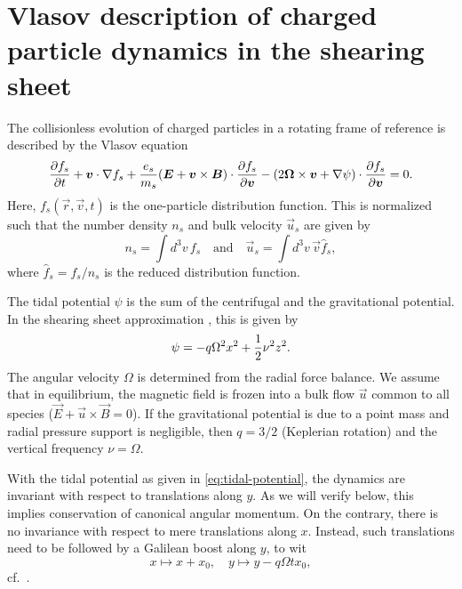 \documentclass[aps,pre,notitlepage,amsmath,amssymb,amsfonts,nobibnotes,nofootinbib,superscriptaddress]{revtex4-1}
\begin{document}
\section{Vlasov description of charged particle dynamics in the shearing
sheet}
\label{sec:vlasov-sheet}

The collisionless evolution of charged particles in a rotating frame of
reference is described by the Vlasov equation
\begin{equation}
  \label{eq:vlasov-sheet}
  \pder{f_s}{t} + \vec{v}\cdot\nabla f_s
  + \frac{\qs}{m_s}(\vec{E} + \vec{v}\times\vec{B})\cdot\pder{f_s}{\vec{v}}
  - (2\vec{\Omega}\times\vec{v} + \nabla\psi)\cdot\pder{f_s}{\vec{v}} = 0.
\end{equation}
Here, $f_s(\vec{r},\vec{v},t)$ is the one-particle distribution function. This
is normalized such that the number density $n_s$ and bulk velocity $\vec{u}_s$
are given by
\begin{equation}
  \label{eq:moments}
  n_s = \int d^3v\,f_s
  \quad\textrm{and}\quad
  \vec{u}_s = \int d^3v\,\vec{v}\hat{f}_s,
\end{equation}
where $\hat{f}_s=f_s/n_s$ is the reduced distribution function.

The tidal potential $\psi$ is the sum of the centrifugal and the gravitational
potential. In the shearing sheet approximation \citep{Goldreich1965}, this is
given by
\begin{equation}
  \label{eq:tidal-potential}
  \psi = -q\Omega^2 x^2 + \frac{1}{2}\vfreq^2 z^2.
\end{equation}
The angular velocity $\Omega$ is determined from the radial force balance. We
assume that in equilibrium, the magnetic field is frozen into a bulk flow
$\vec{u}$ common to all species ($\vec{E}+\vec{u}\times\vec{B}=0$). If the
gravitational potential is due to a point mass and radial pressure support is
negligible, then $q=3/2$ (Keplerian rotation) and the vertical frequency
$\nu=\Omega$.

With the tidal potential as given in \cref{eq:tidal-potential}, the dynamics
are invariant with respect to translations along $y$. As we will verify below,
this implies conservation of canonical angular momentum. On the contrary,
there is no invariance with respect to mere translations along $x$. Instead,
such translations need to be followed by a Galilean boost along $y$, to wit
\begin{equation}
  \label{eq:shear-symmetry}
  x \mapsto x + x_0,\quad
  y \mapsto y - q\Omega t x_0,
\end{equation}
cf.~\citet{Wisdom1988}.
\end{document}
